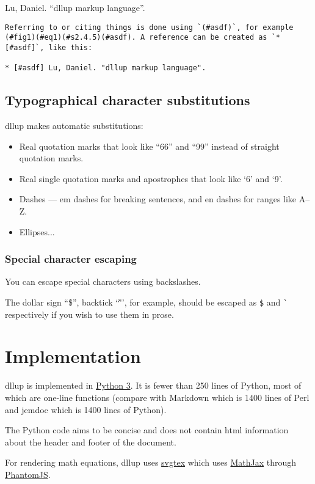 \begin{thebibliography}{99}
 Lu, Daniel. ``dllup markup language''.
\end{thebibliography}\begin{lstlisting}
Referring to or citing things is done using `(#asdf)`, for example (#fig1)(#eq1)(#s2.4.5)(#asdf). A reference can be created as `* [#asdf]`, like this:

* [#asdf] Lu, Daniel. "dllup markup language".
\end{lstlisting}
\subsection{Typographical character substitutions}
\label{s2.5}
dllup makes automatic substitutions:

\begin{itemize}\item Real quotation marks that look like ``66'' and ``99'' instead of straight quotation marks.
\item Real single quotation marks and apostrophes that look like `6' and `9'.
\item Dashes --- em dashes for breaking sentences, and en dashes for ranges like A--Z.
\item Ellipses...
\end{itemize}
\subsubsection{Special character escaping}
\label{s2.5.1}
You can escape special characters using backslashes.

The dollar sign ``\$'', backtick ``\`'', for example, should be escaped as \texttt{\$} and \texttt{\`} respectively if you wish to use them in prose.

\section{Implementation}
\label{s3}
dllup is implemented in \href{https://www.python.org/}{Python 3}. It is fewer than 250 lines of Python, most of which are one-line functions (compare with Markdown which is 1400 lines of Perl and jemdoc which is 1400 lines of Python).

The Python code aims to be concise and does not contain html information about the header and footer of the document.

For rendering math equations, dllup uses \href{https://github.com/linuxfrorg/svgtex}{svgtex} which uses \href{http://www.mathjax.org/}{MathJax} through \href{http://phantomjs.org/}{PhantomJS}.

